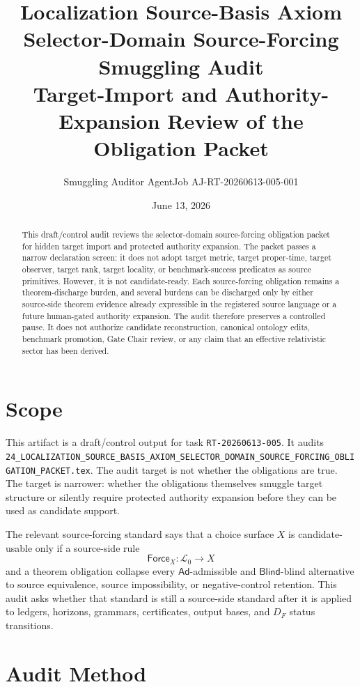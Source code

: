 \documentclass[11pt]{article}
\title{\textbf{Localization Source-Basis Axiom Selector-Domain Source-Forcing Smuggling Audit}\\[0.35em]
\large Target-Import and Authority-Expansion Review of the Obligation Packet}
\author{Smuggling Auditor AgentJob AJ-RT-20260613-005-001}
\date{June 13, 2026}
\newcommand{\Lang}{\mathcal{L}_{0}}
\newcommand{\Ad}{\mathsf{Ad}}
\newcommand{\Blind}{\mathsf{Blind}}
\newcommand{\Force}{\mathsf{Force}}
\begin{document}
\maketitle

\begin{abstract}
This draft/control audit reviews the selector-domain source-forcing
obligation packet for hidden target import and protected authority expansion.
The packet passes a narrow declaration screen: it does not adopt target metric,
target proper-time, target observer, target rank, target locality, or
benchmark-success predicates as source primitives. However, it is not
candidate-ready. Each source-forcing obligation remains a theorem-discharge
burden, and several burdens can be discharged only by either source-side
theorem evidence already expressible in the registered source language or a
future human-gated authority expansion. The audit therefore preserves a
controlled pause. It does not authorize candidate reconstruction, canonical
ontology edits, benchmark promotion, Gate Chair review, or any claim that an
effective relativistic sector has been derived.
\end{abstract}

\section{Scope}

This artifact is a draft/control output for task \texttt{RT-20260613-005}.
It audits
\texttt{24\_LOCALIZATION\_SOURCE\_BASIS\_AXIOM\_SELECTOR\_DOMAIN\_SOURCE\_FORCING\_OBLIGATION\_PACKET.tex}.
The audit target is not whether the obligations are true. The target is
narrower: whether the obligations themselves smuggle target structure or
silently require protected authority expansion before they can be used as
candidate support.

The relevant source-forcing standard says that a choice surface \(X\) is
candidate-usable only if a source-side rule
\[
    \Force_X:\Lang \longrightarrow X
\]
and a theorem obligation collapse every \(\Ad\)-admissible and
\(\Blind\)-blind alternative to source equivalence, source impossibility, or
negative-control retention. This audit asks whether that standard is still a
source-side standard after it is applied to ledgers, horizons, grammars,
certificates, output bases, and \(D_F\) status transitions.

\section{Audit Method}
\end{document}
